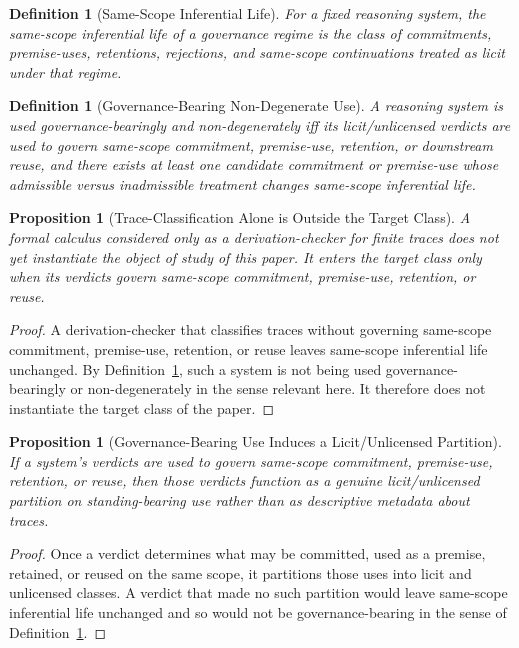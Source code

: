 \documentclass[11pt]{article}
\newtheorem{proposition}[theorem]{Proposition}
\newtheorem{definition}[theorem]{Definition}
\begin{document}
\begin{definition}[Same-Scope Inferential Life]
\label{def:inferlife}
For a fixed reasoning system, the \emph{same-scope inferential life} of a governance regime is the class of commitments, premise-uses, retentions, rejections, and same-scope continuations treated as licit under that regime.
\end{definition}

\begin{definition}[Governance-Bearing Non-Degenerate Use]
\label{def:nondeguse}
A reasoning system is \emph{used governance-bearingly and non-degenerately} iff its licit/unlicensed verdicts are used to govern same-scope commitment, premise-use, retention, or downstream reuse, and there exists at least one candidate commitment or premise-use whose admissible versus inadmissible treatment changes same-scope inferential life.
\end{definition}

\begin{proposition}[Trace-Classification Alone is Outside the Target Class]
\label{prop:traceoutside}
A formal calculus considered only as a derivation-checker for finite traces does not yet instantiate the object of study of this paper. It enters the target class only when its verdicts govern same-scope commitment, premise-use, retention, or reuse.
\end{proposition}

\begin{proof}
A derivation-checker that classifies traces without governing same-scope commitment, premise-use, retention, or reuse leaves same-scope inferential life unchanged. By Definition~\ref{def:nondeguse}, such a system is not being used governance-bearingly or non-degenerately in the sense relevant here. It therefore does not instantiate the target class of the paper.
\end{proof}

\begin{proposition}[Governance-Bearing Use Induces a Licit/Unlicensed Partition]
\label{prop:licitpartition}
If a system's verdicts are used to govern same-scope commitment, premise-use, retention, or reuse, then those verdicts function as a genuine licit/unlicensed partition on standing-bearing use rather than as descriptive metadata about traces.
\end{proposition}

\begin{proof}
Once a verdict determines what may be committed, used as a premise, retained, or reused on the same scope, it partitions those uses into licit and unlicensed classes. A verdict that made no such partition would leave same-scope inferential life unchanged and so would not be governance-bearing in the sense of Definition~\ref{def:nondeguse}.
\end{proof}
\end{document}
